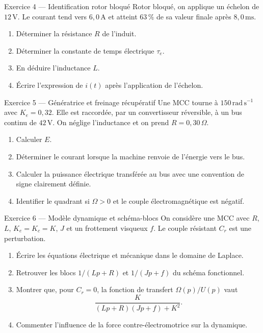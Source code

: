 \begin{TLExercise}{Exercice 4 — Identification rotor bloqué}
Rotor bloqué, on applique un échelon de $12\,\mathrm V$. Le courant tend vers
$6{,}0\,\mathrm A$ et atteint $63\,\%$ de sa valeur finale après $8{,}0\,\mathrm{ms}$.
\begin{enumerate}
  \item Déterminer la résistance $R$ de l'induit.
  \item Déterminer la constante de temps électrique $\tau_e$.
  \item En déduire l'inductance $L$.
  \item Écrire l'expression de $i(t)$ après l'application de l'échelon.
\end{enumerate}
\end{TLExercise}

\begin{TLExercise}{Exercice 5 — Génératrice et freinage récupératif}
Une MCC tourne à $150\,\mathrm{rad\,s^{-1}}$ avec $K_e=0{,}32$. Elle est raccordée,
par un convertisseur réversible, à un bus continu de $42\,\mathrm V$. On néglige
l'inductance et on prend $R=0{,}30\,\Omega$.
\begin{enumerate}
  \item Calculer $E$.
  \item Déterminer le courant lorsque la machine renvoie de l'énergie vers le bus.
  \item Calculer la puissance électrique transférée au bus avec une convention de signe clairement définie.
  \item Identifier le quadrant si $\Omega>0$ et le couple électromagnétique est négatif.
\end{enumerate}
\end{TLExercise}

\begin{TLExercise}{Exercice 6 — Modèle dynamique et schéma-blocs}
On considère une MCC avec $R$, $L$, $K_e=K_c=K$, $J$ et un frottement visqueux $f$.
Le couple résistant $C_r$ est une perturbation.
\begin{enumerate}
  \item Écrire les équations électrique et mécanique dans le domaine de Laplace.
  \item Retrouver les blocs $1/(Lp+R)$ et $1/(Jp+f)$ du schéma fonctionnel.
  \item Montrer que, pour $C_r=0$, la fonction de transfert $\Omega(p)/U(p)$ vaut
  \[
    \frac{K}{(Lp+R)(Jp+f)+K^2}.
  \]
  \item Commenter l'influence de la force contre-électromotrice sur la dynamique.
\end{enumerate}
\end{TLExercise}

